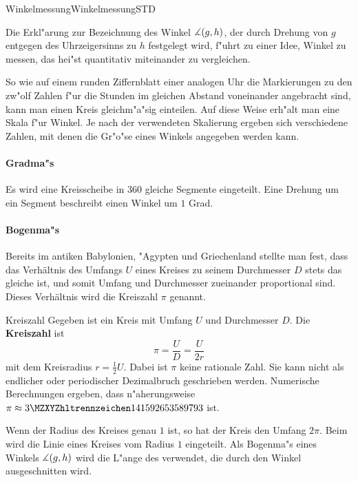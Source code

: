 \begin{MXContent}{Winkelmessung}{Winkelmessung}{STD}


Die Erkl"arung zur Bezeichnung des Winkel $\measuredangle(g,h)$, der durch
Drehung von $g$ entgegen des Uhrzeigersinns zu $h$ festgelegt wird, f"uhrt 
zu einer Idee, Winkel zu messen, das hei"st quantitativ miteinander zu 
vergleichen.

So wie auf einem runden Ziffernblatt einer analogen Uhr die Markierungen zu den
zw"olf Zahlen f"ur die Stunden im gleichen Abstand voneinander angebracht sind,
kann man einen Kreis gleichm"a"sig einteilen. Auf diese Weise erh"alt man eine
Skala f"ur Winkel. Je nach der verwendeten Skalierung ergeben sich 
verschiedene Zahlen, mit denen die Gr"o"se eines Winkels angegeben werden kann.

\paragraph{Gradma"s}

Es wird eine Kreisscheibe in $360$ gleiche Segmente eingeteilt. Eine Drehung
um ein Segment beschreibt einen Winkel um $1$ Grad.


\paragraph{Bogenma"s}
Bereits im antiken Babylonien, "Agypten und Griechenland stellte man fest, 
dass das Verh\"altnis des Umfangs $U$ eines Kreises zu seinem Durchmesser 
$D$ stets das gleiche ist, und somit Umfang und Durchmesser zueinander 
proportional sind.
Dieses Verh\"altnis wird die Kreiszahl $\pi$ genannt. 
\begin{MXInfo}{Kreiszahl}%
Gegeben ist ein Kreis mit Umfang $U$ und Durchmesser $D$.
Die \textbf{Kreiszahl} ist
\[
\pi = \frac{U}{D} = \frac{U}{2r} %
\]
mit dem Kreisradius $r = \frac{1}{2} U$.
Dabei ist $\pi$ keine rationale Zahl. Sie kann nicht als endlicher oder 
periodischer Dezimalbruch geschrieben werden. Numerische Berechnungen ergeben,
dass n"aherungsweise $\pi \approx \MZahl{3}{141592653589793}$ ist.
\end{MXInfo}

Wenn der Radius des Kreises genau $1$ ist, so hat der Kreis den Umfang $2\pi$. 
Beim  wird die Linie eines Kreises vom Radius $1$
eingeteilt.
Als Bogenma"s eines Winkels $\measuredangle(g,h)$ wird die L"ange des 
 verwendet, die durch den Winkel 
{\glqq}ausgeschnitten{\grqq} wird.


\end{MXContent}
